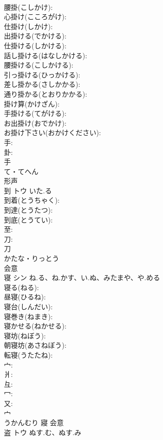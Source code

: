 \documentclass[8pt]{extreport}
\begin{document}
\begin{CJK}{UTF8}{min}
\\	腰掛(こしかけ): 
\\	心掛け(こころがけ): 
\\	仕掛け(しかけ): 
\\	出掛ける(でかける): 
\\	仕掛ける(しかける): 
\\	話し掛ける(はなしかける): 
\\	腰掛ける(こしかける): 
\\	引っ掛ける(ひっかける): 
\\	差し掛かる(さしかかる): 
\\	通り掛かる(とおりかかる): 
\\	掛け算(かけざん): 
\\	手掛ける(てがける): 
\\	お出掛け(おでかけ): 
\\	お掛け下さい(おかけください): 
\\	手: 
\\	卦: 
\\	手	
\\	て・てへん	
\\	形声 
\\	到	トウ	いた.る		
\\	到着(とうちゃく): 
\\	到達(とうたつ): 
\\	到底(とうてい): 
\\	至: 
\\	刀: 
\\	刀	
\\	かたな・りっとう	
\\	会意 
\\	寝	シン	ね.る、ね.かす、い.ぬ、みたまや、や.める		
\\	寝る(ねる): 
\\	昼寝(ひるね): 
\\	寝台(しんだい): 
\\	寝巻き(ねまき): 
\\	寝かせる(ねかせる): 
\\	寝坊(ねぼう): 
\\	朝寝坊(あさねぼう): 
\\	転寝(うたたね): 
\\	宀: 
\\	爿: 
\\	彑: 
\\	冖: 
\\	又: 
\\	宀	
\\	うかんむり	寢	会意 
\\	盗	トウ	ぬす.む、ぬす.み		

\end{CJK}
\end{document}
